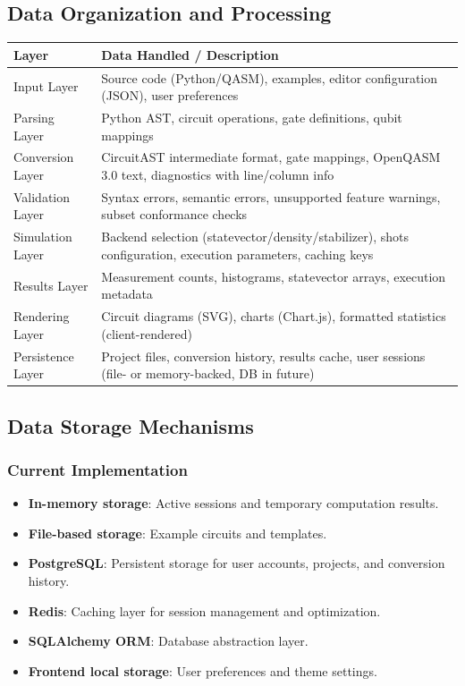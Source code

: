 \subsection{Data Organization and Processing}

\begin{longtable}{p{} p{}}
\toprule
\textbf{Layer} & \textbf{Data Handled / Description} \\
\midrule
Input Layer & Source code (Python/QASM), examples, editor configuration (JSON), user preferences \\
Parsing Layer & Python AST, circuit operations, gate definitions, qubit mappings \\
Conversion Layer & CircuitAST intermediate format, gate mappings, OpenQASM 3.0 text, diagnostics with line/column info \\
Validation Layer & Syntax errors, semantic errors, unsupported feature warnings, subset conformance checks \\
Simulation Layer & Backend selection (statevector/density/stabilizer), shots configuration, execution parameters, caching keys \\
Results Layer & Measurement counts, histograms, statevector arrays, execution metadata \\
Rendering Layer & Circuit diagrams (SVG), charts (Chart.js), formatted statistics (client-rendered) \\
Persistence Layer & Project files, conversion history, results cache, user sessions (file- or memory-backed, DB in future) \\
\bottomrule
\end{longtable}

\subsection{Data Storage Mechanisms}

\subsubsection{Current Implementation}
\begin{itemize}
    \item \textbf{In-memory storage}: Active sessions and temporary computation results.
    \item \textbf{File-based storage}: Example circuits and templates.
    \item \textbf{PostgreSQL}: Persistent storage for user accounts, projects, and conversion history.
    \item \textbf{Redis}: Caching layer for session management and optimization.
    \item \textbf{SQLAlchemy ORM}: Database abstraction layer.
    \item \textbf{Frontend local storage}: User preferences and theme settings.
\end{itemize}

